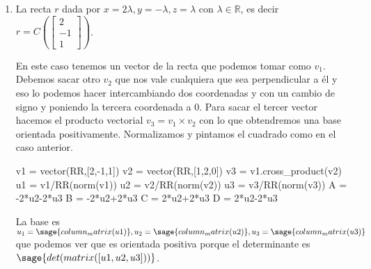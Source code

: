 \documentclass{amsart}
\begin{document}
\begin{enumerate}
\item La recta $r$ dada por $x = 2\lambda, y = -\lambda, z = \lambda$ 
con $\lambda \in {\mathbb R}$, es decir
$r = C\left(\left[\begin{array}{c} 2 \\ -1 \\ 1 \end{array} \right]\right)$.

En este caso tenemos un vector de la recta que podemos tomar como $v_1$. Debemos
sacar otro $v_2$ que nos vale cualquiera que sea perpendicular a él y eso lo 
podemos hacer intercambiando dos coordenadas y con un cambio de signo y poniendo
la tercera coordenada a $0$. Para sacar el tercer vector hacemos el producto 
vectorial $v_3 = v_1 \times v_2$ con lo que obtendremos una base orientada positivamente.
Normalizamos y pintamos el cuadrado como en el caso anterior.

\begin{sageblock}
v1 = vector(RR,[2,-1,1])
v2 = vector(RR,[1,2,0])
v3 = v1.cross_product(v2)
u1 = v1/RR(norm(v1))
u2 = v2/RR(norm(v2))
u3 = v3/RR(norm(v3))
A = -2*u2-2*u3
B = -2*u2+2*u3
C =  2*u2+2*u3
D =  2*u2-2*u3
\end{sageblock}

La base es $u_1 = \sage{column_matrix(u1)}, u_2 = \sage{column_matrix(u2)},
u_3 = \sage{column_matrix(u3)}$ que podemos ver que es orientada positiva porque
el determinante es $\sage{det(matrix([u1,u2,u3]))}$.

\begin{sagesub}
\begin{center}
\end{center}
\end{sagesub}

\end{enumerate}

\end{document}
